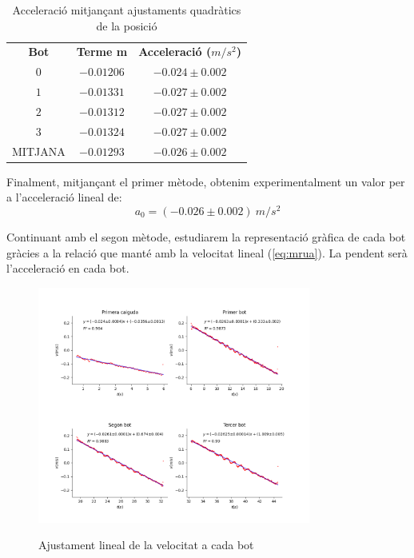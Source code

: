 \documentclass[11pt]{article}
\begin{document}
    \begin{table}[h]
        \centering
        \begin{tabular}{ccc}
            \rowcolor[HTML]{CBCEFB} 
            \textbf{Bot}                    & \textbf{Terme m}    & \textbf{Acceleració ($m/s^2$)}             \\
            \cellcolor[HTML]{ECF4FF}$0$       & $-0.01206$          & $-0.024 \pm 0.002$\\
            \rowcolor[HTML]{EFEFEF} 
            \cellcolor[HTML]{DAE8FC}$1$       & $-0.01331$          & $-0.027 \pm 0.002$\\
            \cellcolor[HTML]{ECF4FF}$2$       & $-0.01312$          & $-0.027 \pm 0.002$\\
            \rowcolor[HTML]{EFEFEF} 
            \cellcolor[HTML]{DAE8FC}$3$       & $-0.01324$          & $-0.027 \pm 0.002$\\
            \rowcolor[HTML]{FFFFC7} 
            \cellcolor[HTML]{FFFFC7}MITJANA   &$-0.01293$           & $-0.026 \pm 0.002$\\
        \end{tabular}
        \label{tab:acc1}
        \caption{Acceleració mitjançant ajustaments quadràtics de la posició}
    \end{table}

    Finalment, mitjançant el primer mètode, obtenim experimentalment un valor per a l'acceleració lineal de: $$\boxed{a_0=(-0.026\pm0.002)\ m/s^2}$$
    \clearpage

    Continuant amb el segon mètode, estudiarem la representació gràfica de cada bot gràcies a la relació que manté amb la velocitat lineal (\ref{eq:mrua}). La pendent serà l'acceleració en cada bot.

    \begin{figure}[h]
        \vspace{-0.2cm}
        \begin{center}
            \includegraphics[width=0.8\textwidth]{fotos/velocitat.png}
            \label{fig:4graf}
            \caption{Ajustament lineal de la velocitat a cada bot}
        \end{center}
    \end{figure}
\end{document}
